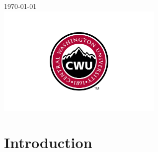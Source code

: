 \documentclass[12pt]{article}
\begin{document}
\begin{titlepage}
        
        
        {\large \today}\\ %
        
        
        \includegraphics[width=8cm]{CWU-Logo.png}\\[.5cm] %
        
        
        \vfill %
        
    \end{titlepage}
    \newpage
    \tableofcontents
    \newpage
    
    
    
    \section{Introduction}
    
\end{document}
